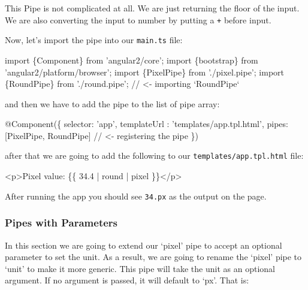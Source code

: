 \documentclass[12pt,]{article}
\newenvironment{Shaded}{}{}
\newcommand{\KeywordTok}[1]{\textcolor[rgb]{0.00,0.00,1.00}{{#1}}}
\newcommand{\CommentTok}[1]{\textcolor[rgb]{0.00,0.50,0.00}{{#1}}}
\newcommand{\FunctionTok}[1]{{#1}}
\newcommand{\NormalTok}[1]{{#1}}
\begin{document}
This Pipe is not complicated at all. We are just returning the floor of
the input. We are also converting the input to number by putting a
\texttt{+} before input.

Now, let's import the pipe into our \texttt{main.ts} file:

\begin{Shaded}
\begin{Highlighting}[numbers=left,,]
\KeywordTok{import \{Component\} from 'angular2/core';}
\KeywordTok{import \{bootstrap\} from 'angular2/platform/browser';}
\KeywordTok{import \{PixelPipe\} from './pixel.pipe';}
\KeywordTok{import \{RoundPipe\} from './round.pipe';} \CommentTok{// <- importing `RoundPipe`}
\end{Highlighting}
\end{Shaded}

and then we have to add the pipe to the list of pipe array:

\begin{Shaded}
\begin{Highlighting}[numbers=left,,]
\FunctionTok{@Component}\NormalTok{(\{}
  \NormalTok{selector: 'app',}
  \NormalTok{templateUrl : 'templates/app.}\FunctionTok{tpl}\NormalTok{.}\FunctionTok{html}\NormalTok{',}
  \NormalTok{pipes: [PixelPipe, RoundPipe] }\CommentTok{// <- registering the pipe}
\NormalTok{\})}
\end{Highlighting}
\end{Shaded}

after that we are going to add the following to our
\texttt{templates/app.tpl.html} file:

\begin{Shaded}
\begin{Highlighting}[numbers=left,,]
\KeywordTok{<p>}\NormalTok{Pixel value: \{\{ 34.4 | round | pixel \}\}}\KeywordTok{</p>}
\end{Highlighting}
\end{Shaded}

After running the app you should see \texttt{34.px} as the output on the
page.

\subsubsection{Pipes with Parameters}\label{pipes-with-parameters}

In this section we are going to extend our `pixel' pipe to accept an
optional parameter to set the unit. As a result, we are going to rename
the `pixel' pipe to `unit' to make it more generic. This pipe will take
the unit as an optional argument. If no argument is passed, it will
default to `px'. That is:
\end{document}
